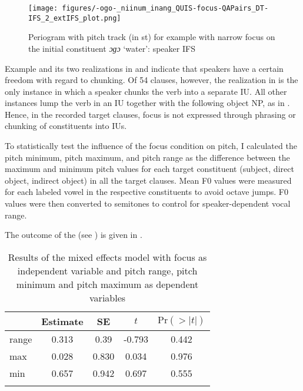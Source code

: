 \begin{figure}
	\texttt{[image: figures/-ogo-\_niinum\_inang\_QUIS-focus-QAPairs\_DT-IFS\_2\_extIFS\_plot.png]}
	\caption{Periogram with pitch track (in st) for example  with narrow focus on the initial constituent \textit{ɔɡɔ} `water': speaker IFS }
	\label{ɔɡɔ_niinum_inang2}
\end{figure}










Example  and its two realizations in  
and  
 indicate that speakers have a certain freedom with regard to  chunking.  Of 54 clauses, however, the realization in   is the only instance in which a speaker chunks the verb into a separate IU. All other instances lump the verb in an IU together with the following object NP, as in  	. Hence, in the recorded target clauses, focus is not expressed through phrasing or chunking of constituents into IUs. 





To statistically test the influence of the focus condition on pitch, I calculated the  pitch minimum,  pitch maximum, and pitch range as the difference between the maximum and minimum pitch values for each target constituent (subject, direct object, indirect object) in all the target clauses. Mean F0 values were measured for each labeled vowel in the respective constituents to avoid octave jumps. F0 values were then converted to semitones to control for speaker-dependent vocal range.



The outcome of the (see ) is given in  .



\begin{table}
\caption{Results of the mixed effects model with focus as independent variable and pitch range, pitch minimum and pitch maximum as dependent variables}\label{lmer_pitch}
\begin{tabular}{l S[table-format=-1.3] S[table-format=1.3] S[table-format=-1.3] S[table-format=1.3] }
	\lsptoprule
	      & {Estimate} & {SE} & {$t$} & {$\text{Pr}(>|t|)$}\\\midrule
	range & 0.313 & 0.39    & -0.793 & 0.442\\ 
	max  & 0.028  & 0.830   & 0.034  & 0.976\\
	min  & 0.657  & 0.942   & 0.697  & 0.555\\
	\lspbottomrule             
\end{tabular}
\end{table}

